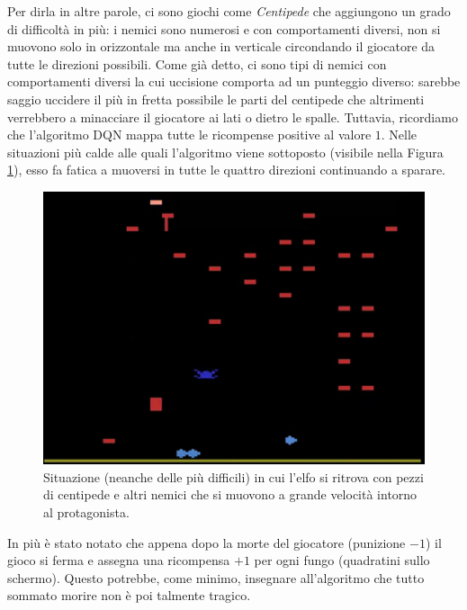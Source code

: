 \documentclass[twoside,twocolumn,10pt]{extarticle}
\theoremstyle{definition}
\begin{document}
		Per dirla in altre parole, ci sono giochi come \textit{Centipede} che aggiungono un grado di difficoltà in più: i nemici sono numerosi e con comportamenti diversi, non si muovono solo in orizzontale ma anche in verticale circondando il giocatore da tutte le direzioni possibili. Come già detto, ci sono tipi di nemici con comportamenti diversi la cui uccisione comporta ad un punteggio diverso: sarebbe saggio uccidere il più in fretta possibile le parti del centipede che altrimenti verrebbero a minacciare il giocatore ai lati o dietro le spalle. Tuttavia, ricordiamo che l'algoritmo DQN mappa tutte le ricompense positive al valore $1$. Nelle situazioni più calde alle quali l'algoritmo viene sottoposto (visibile nella Figura \ref{fig:centipede}), esso fa fatica a muoversi in tutte le quattro direzioni continuando a sparare.		
		\begin{figure}[t]
			\centering
			\includegraphics[scale=.5]{images/centipede1.png}
			\caption{Situazione (neanche delle più difficili) in cui l'elfo si ritrova con pezzi di centipede e altri nemici che si muovono a grande velocità intorno al protagonista.}
			\label{fig:centipede}
		\end{figure}
		In più è stato notato che appena dopo la morte del giocatore (punizione $-1$) il gioco si ferma e assegna una ricompensa $+1$ per ogni fungo (quadratini sullo schermo). Questo potrebbe, come minimo, insegnare all'algoritmo che tutto sommato morire non è poi talmente tragico. 
		
\end{document}
